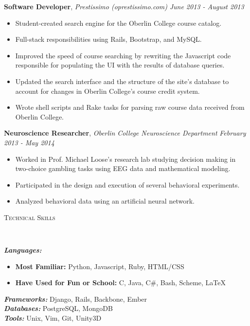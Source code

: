 \documentclass[9pt]{article}
\newenvironment{changemargin}[2]{%
  \begin{list}{}{%
    \setlength{\topsep}{0pt}%
    \setlength{\leftmargin}{#1}%
    \setlength{\rightmargin}{#2}%
    \setlength{\listparindent}{\parindent}%
    \setlength{\itemindent}{\parindent}%
    \setlength{\parsep}{\parskip}%
  }%
  \item[]}{\end{list}
}
\newcommand{\lineover}{
	\begin{changemargin}{-0.05in}{-0.05in}
		\vspace*{-8pt}
		\hrulefill \\
		\vspace*{-2pt}
	\end{changemargin}
}
\newcommand{\header}[1]{
	\begin{changemargin}{-0.5in}{-0.5in}
		\scshape{#1}\\
  	\lineover
	\end{changemargin}
}
\newenvironment{body} {
	\vspace*{-16pt}
	\begin{changemargin}{-0.25in}{-0.5in}
  }	
	{\end{changemargin}
}
\begin{document}
\begin{body}
	\textbf{Software Developer}, \emph{Prestissimo (oprestissimo.com)} \hfill \emph{June 2013 - August 2013}\\
	\vspace*{-4pt}
	\begin{itemize} \itemsep -0pt  %
		\item Student-created search engine for the  Oberlin College course catalog.
		\item Full-stack responsibilities using Rails, Bootstrap, and MySQL.
		\item Improved the speed of course searching by rewriting the Javascript code responsible for populating the UI with the results of database queries.
		\item Updated the search interface and the structure of the site's database to account for changes in Oberlin College's course credit system.
		\item Wrote shell scripts and Rake tasks for parsing raw course data received from Oberlin College.
	\end{itemize}

	\textbf{Neuroscience Researcher}, \emph{Oberlin College Neuroscience Department} \hfill \emph{February 2013 - May 2014}\\
	\vspace*{-4pt}
	\begin{itemize} \itemsep -0pt  %
		\item Worked in Prof. Michael Loose's research lab studying decision making in two-choice gambling tasks using EEG data and mathematical modeling.
		\item Participated in the design and execution of several behavioral experiments.
		\item Analyzed behavioral data using an artificial neural network.
	\end{itemize}
\end{body}

\smallskip

\header{Technical Skills}

\begin{body}
	\vspace{14pt}
	\emph{\textbf{Languages:}}{} 
		\begin{itemize} \itemsep -0pt  %
			\item \textbf{Most Familiar:} Python, Javascript, Ruby, HTML/CSS
			\item \textbf{Have Used for Fun or School:} C, Java, C\#, Bash, Scheme, \LaTeX \\
		\end{itemize}
	\medskip
	\emph{\textbf{Frameworks:}}{} Django, Rails, Backbone, Ember \\
	\medskip
	\emph{\textbf{Databases:}}{} PostgreSQL, MongoDB \\
	\medskip
	\emph{\textbf{Tools:}}{} Unix, Vim, Git, Unity3D \\
\end{body}
\end{document}
